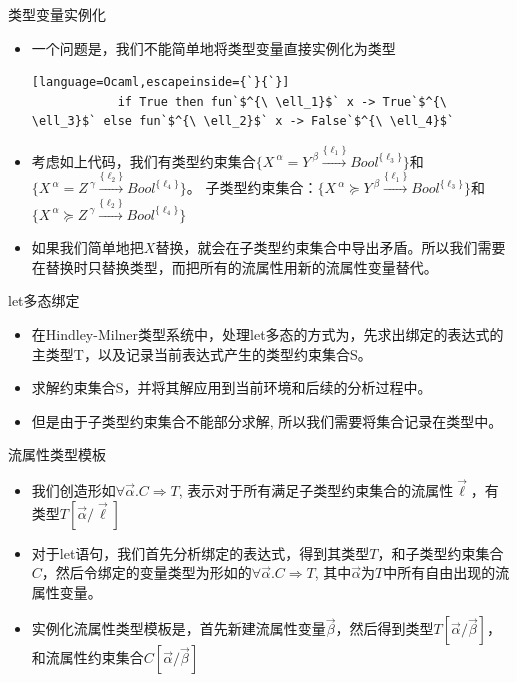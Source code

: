 \documentclass[9pt]{beamer}
\begin{document}
\begin{frame}[fragile]{类型变量实例化}
	\begin{itemize}
		\item 一个问题是，我们不能简单地将类型变量直接实例化为类型
		\begin{lstlisting}[language=Ocaml,escapeinside={`}{`}]
			if True then fun`$^{\ \ell_1}$` x -> True`$^{\ \ell_3}$` else fun`$^{\ \ell_2}$` x -> False`$^{\ \ell_4}$`
		\end{lstlisting}
		\vspace{0.2em}
		\item 考虑如上代码，我们有类型约束集合$\{X^{\ \alpha} = Y^{\ \beta}\xrightarrow{\{\ell_1\}}Bool^{\{\ell_3\}}\}$和$\{X^{\ \alpha} = Z^{\ \gamma}\xrightarrow{\{\ell_2\}}Bool^{\{\ell_4\}}\}$。 子类型约束集合：$\{X^{\ \alpha} \succeq Y^{\ \beta}\xrightarrow{\{\ell_1\}}Bool^{\{\ell_3\}}\}$和$\{X^{\ \alpha} \succeq Z^{\ \gamma}\xrightarrow{\{\ell_2\}}Bool^{\{\ell_4\}}\}$
		\vspace{0.2em}
		\item 如果我们简单地把$X$替换，就会在子类型约束集合中导出矛盾。所以我们需要在替换时只替换类型，而把所有的流属性用新的流属性变量替代。
	\end{itemize}
\end{frame}

\begin{frame}[fragile]{let多态绑定}
	\begin{itemize}
		\item 在Hindley-Milner类型系统中，处理let多态的方式为，先求出绑定的表达式的主类型T，以及记录当前表达式产生的类型约束集合S。
		\vspace{0.2em}
		\item 求解约束集合S，并将其解应用到当前环境和后续的分析过程中。
		\vspace{0.2em}
		\item 但是由于子类型约束集合不能部分求解, 所以我们需要将集合记录在类型中。
	\end{itemize}
\end{frame}

\begin{frame}[fragile]{流属性类型模板}
	\begin{itemize}
		\item 我们创造形如$\forall \vec{\alpha}.C\Rightarrow T$, 表示对于所有满足子类型约束集合的流属性$\vec{\ell}$，有类型$T[\vec{\alpha}/\vec{\ell}]$
		\vspace{0.2em}
		\item 对于let语句，我们首先分析绑定的表达式，得到其类型$T$，和子类型约束集合$C$，然后令绑定的变量类型为形如的$\forall\vec{\alpha}.C\Rightarrow T$, 其中$\vec{\alpha}$为$T$中所有自由出现的流属性变量。
		\vspace{0.2em}
		\item 实例化流属性类型模板是，首先新建流属性变量$\vec{\beta}$，然后得到类型$T[\vec{\alpha}/\vec{\beta}]$，和流属性约束集合$C[\vec{\alpha}/\vec{\beta}]$
	\end{itemize}
\end{frame}
\end{document}
